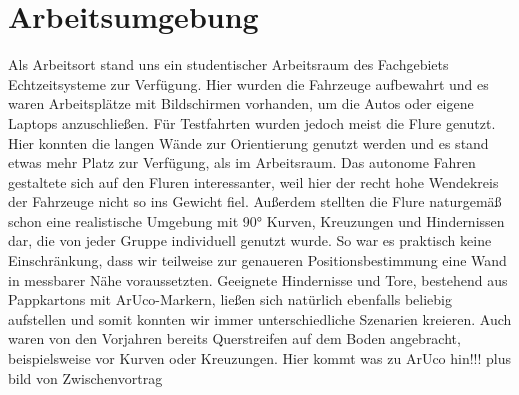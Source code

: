 \section{Arbeitsumgebung}
\label{sec:arbeitsumgebung}
Als Arbeitsort stand uns ein studentischer Arbeitsraum des Fachgebiets Echtzeitsysteme zur Verfügung. Hier wurden die Fahrzeuge aufbewahrt und es waren Arbeitsplätze mit Bildschirmen vorhanden, um die Autos oder eigene Laptops anzuschließen. 
\newline
Für Testfahrten wurden jedoch meist die Flure genutzt. Hier konnten die langen Wände zur Orientierung genutzt werden und es stand etwas mehr Platz zur Verfügung, als im Arbeitsraum. Das autonome Fahren gestaltete sich auf den Fluren interessanter, weil hier der recht hohe Wendekreis der Fahrzeuge nicht so ins Gewicht fiel. Außerdem stellten die Flure naturgemäß schon eine realistische Umgebung mit 90° Kurven, Kreuzungen und Hindernissen dar, die von jeder Gruppe individuell genutzt wurde. So war es praktisch keine Einschränkung, dass wir teilweise zur genaueren Positionsbestimmung eine Wand in messbarer Nähe voraussetzten. Geeignete Hindernisse und Tore, bestehend aus Pappkartons mit ArUco-Markern, ließen sich natürlich ebenfalls beliebig aufstellen und somit konnten wir immer unterschiedliche Szenarien kreieren. Auch waren von den Vorjahren bereits Querstreifen auf dem Boden angebracht, beispielsweise vor Kurven oder Kreuzungen.
\newline
\newline
Hier kommt was zu ArUco hin!!! plus bild von Zwischenvortrag
